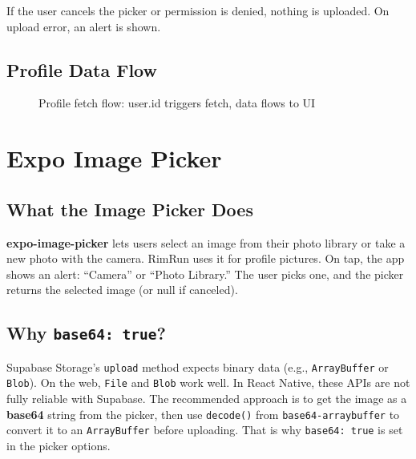 \documentclass[11pt,a4paper]{article}
\begin{document}
If the user cancels the picker or permission is denied, nothing is uploaded. On upload error, an alert is shown.

\subsection{Profile Data Flow}

\begin{figure}[h]
\centering
{}
\caption{Profile fetch flow: user.id triggers fetch, data flows to UI}
\end{figure}

\section{Expo Image Picker}

\subsection{What the Image Picker Does}

\textbf{expo-image-picker} lets users select an image from their photo library or take a new photo with the camera. RimRun uses it for profile pictures. On tap, the app shows an alert: ``Camera'' or ``Photo Library.'' The user picks one, and the picker returns the selected image (or null if canceled).

\subsection{Why \texttt{base64: true}?}

Supabase Storage's \texttt{upload} method expects binary data (e.g., \texttt{ArrayBuffer} or \texttt{Blob}). On the web, \texttt{File} and \texttt{Blob} work well. In React Native, these APIs are not fully reliable with Supabase. The recommended approach is to get the image as a \textbf{base64} string from the picker, then use \texttt{decode()} from \texttt{base64-arraybuffer} to convert it to an \texttt{ArrayBuffer} before uploading. That is why \texttt{base64: true} is set in the picker options.
\end{document}
